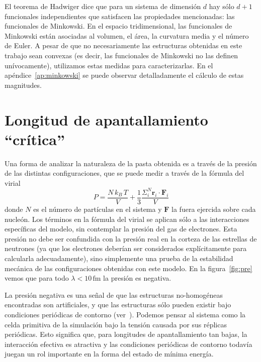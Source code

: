 El teorema de Hadwiger dice que para un sistema de dimensión $d$ hay sólo $d+1$ funcionales independientes que satisfacen las propiedades mencionadas: las funcionales de Minkowski. En el espacio tridimensional, las funcionales de Minkowski están asociadas al volumen, el área, la curvatura media y el número de Euler. A pesar de que no necesariamente las estructuras obtenidas en este trabajo sean convexas (es decir, las funcionales de Minkowski no las definen unívocamente), utilizamos estas medidas para caracterizarlas. En el apéndice~\ref{ap:minkowski} se puede observar detalladamente el cálculo de estas magnitudes.

\section{Longitud de apantallamiento ``crítica''}\label{lambda_c}

Una forma de analizar la naturaleza de la pasta obtenida es a través de la presión de las distintas configuraciones, que se puede medir a través de la fórmula del virial
\begin{equation*}
P=\frac{N\,k_B\,T}{V} + \frac{1}{3}
\frac{\Sigma_{i}^{N}\mathbf{r}_i\cdot\mathbf{F}_i}{V}
\end{equation*}
donde $N$ es el número de partículas en el sistema y $\mathbf{F}$ la fuera ejercida sobre cada nucleón.
Los términos en la fórmula del virial se aplican sólo a las interacciones específicas del modelo, sin contemplar la presión del gas de electrones.
Esta presión no debe ser confundida con la presión real en la corteza de las estrellas de neutrones (ya que los electrones deberían ser considerados explícitamente para calcularla adecuadamente), sino simplemente una prueba de la estabilidad mecánica de las configuraciones obtenidas con este modelo.
En la figura~\ref{fig:pre} vemos que para todo $\lambda<10\,\text{fm}$ la presión es negativa.

La presión negativa es una señal de que las estructuras no-homogéneas encontradas son artificiales, y que las estructuras sólo pueden existir bajo condiciones periódicas de contorno (ver~\cite{binder_beyond_2012,gimenez_molinelli_simulations_2014}).
Podemos pensar al sistema como la celda primitiva de la simulación bajo la tensión causada por sus réplicas periódicas.
Esto significa que, para longitudes de apantallamiento tan bajas, la interacción efectiva es atractiva y las condiciones periódicas de contorno todavía juegan un rol importante en la forma del estado de mínima energía.

